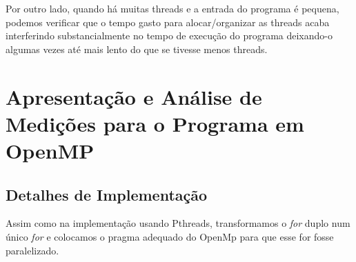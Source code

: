 \documentclass[final,12pt,a4paper]{elsarticle}
\begin{document}
Por outro lado, quando há muitas threads e a entrada do programa é pequena, podemos verificar que o tempo gasto para alocar/organizar as threads acaba interferindo substancialmente no tempo de execução do programa deixando-o algumas vezes até mais lento do que se tivesse menos threads.

\section{Apresentação e Análise de Medições para o Programa em OpenMP}

\subsection{Detalhes de Implementação}

Assim como na implementação usando Pthreads, transformamos o \textit{for} duplo num único \textit{for} e colocamos o pragma adequado do OpenMp para que esse for fosse paralelizado.

\clearpage
\end{document}
